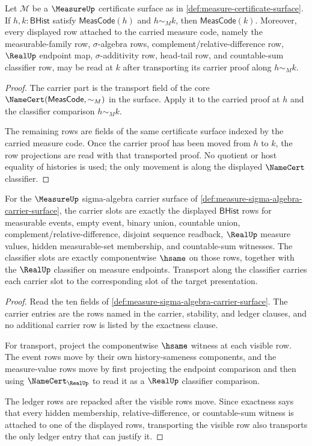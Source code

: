 \begin{theorem}
\label{thm:measure-obligation-carrier-transport}
Let $\mathcal{M}$ be a $\MeasureUp$ certificate surface as in \autoref{def:measure-certificate-surface}. If $h,k:\mathsf{BHist}$ satisfy $\mathsf{MeasCode}(h)$ and $h\sim_M k$, then $\mathsf{MeasCode}(k)$. Moreover, every displayed row attached to the carried measure code, namely the measurable-family row, $\sigma$-algebra rows, complement/relative-difference row, $\RealUp$ endpoint map, $\sigma$-additivity row, head-tail row, and countable-sum classifier row, may be read at $k$ after transporting its carrier proof along $h\sim_M k$.
\end{theorem}
\begin{proof}
The carrier part is the transport field of the core $\NameCert(\mathsf{MeasCode},\sim_M)$ in the surface. Apply it to the carried proof at $h$ and the classifier comparison $h\sim_M k$.

The remaining rows are fields of the same certificate surface indexed by the carried measure code. Once the carrier proof has been moved from $h$ to $k$, the row projections are read with that transported proof. No quotient or host equality of histories is used; the only movement is along the displayed $\NameCert$ classifier.
\end{proof}

\begin{theorem}
\label{thm:measure-carrier-classifier-obligation}
For the $\MeasureUp$ sigma-algebra carrier surface of
\autoref{def:measure-sigma-algebra-carrier-surface}, the carrier slots are
exactly the displayed $\mathsf{BHist}$ rows for measurable events, empty event,
binary union, countable union, complement/relative-difference, disjoint
sequence readback, $\RealUp$ measure values, hidden measurable-set membership,
and countable-sum witnesses. The classifier slots are exactly componentwise
$\hsame$ on those rows, together with the $\RealUp$ classifier on measure
endpoints. Transport along the classifier carries each carrier slot to the
corresponding slot of the target presentation.
\end{theorem}
\begin{proof}
Read the ten fields of
\autoref{def:measure-sigma-algebra-carrier-surface}. The carrier entries are
the rows named in the carrier, stability, and ledger clauses, and no additional
carrier row is listed by the exactness clause.

For transport, project the componentwise $\hsame$ witness at each visible row.
The event rows move by their own history-sameness components, and the
measure-value rows move by first projecting the endpoint comparison and then
using $\NameCert_{\RealUp}$ to read it as a $\RealUp$ classifier comparison.

The ledger rows are repacked after the visible rows move. Since exactness says
that every hidden membership, relative-difference, or countable-sum witness is
attached to one of the displayed rows, transporting the visible row also
transports the only ledger entry that can justify it.
\end{proof}

